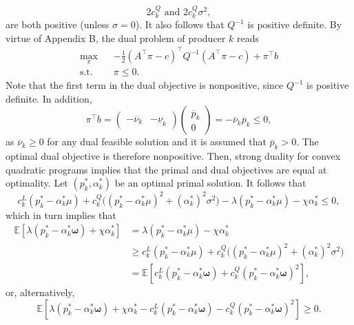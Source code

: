 \documentclass{article}
\begin{document}
\begin{equation*}
2c_k^Q \mbox{ and } 2c_k^Q\sigma^2,
\end{equation*}
are both positive (unless $\sigma = 0$). It also follows that $Q^{-1}$ is positive definite. By virtue of Appendix B, the dual problem of producer $k$ reads 
\begin{align*}
\underset{\pi}{\max} \hspace{10pt} & -\frac{1}{2}(A^\top \pi -c)^\top Q^{-1} (A^\top \pi -c) + \pi^\top b\\
\mbox{s.t. } & \pi \le 0.
\end{align*}
Note that the first term in the dual objective is nonpositive, since $Q^{-1}$ is positive definite. In addition,
\begin{equation*}
\pi^\top b = \begin{pmatrix}-\overline{\nu}_k & -\underline{\nu}_k \end{pmatrix}\begin{pmatrix} \overline{p}_k\\0\end{pmatrix} = -\overline{\nu}_k \overline{p}_k \le 0,
\end{equation*}
as $\overline{\nu}_k \ge 0$ for any dual feasible solution and it is assumed that $\overline{p}_k > 0$. The optimal dual objective is therefore nonpositive. Then, strong duality for convex quadratic programs \cite{Dorn1960} implies that the primal and dual objectives are equal at optimality. Let $(p_k^*, \alpha_k^*)$ be an optimal primal solution. It follows that
\begin{equation*}
c_k^L(p_k^* - \alpha_k^* \mu) + c_k^Q \big((p_k^* - \alpha_k^* \mu)^2 + (\alpha_k^*)^2 \sigma^2\big) - \lambda (p_k^* - \alpha_k^* \mu) - \chi \alpha_k^* \le 0,
\end{equation*}
which in turn implies that
\begin{align*}
\mathbb{E}[\lambda (p_k^* - \alpha_k^* \boldsymbol{\omega}) + \chi \alpha_k^*] &= \lambda (p_k^* - \alpha_k^* \mu) - \chi \alpha_k^*\\
&\ge c_k^L(p_k^* - \alpha_k^* \mu) + c_k^Q \big((p_k^* - \alpha_k^* \mu)^2 + (\alpha_k^*)^2 \sigma^2\big)\\ 
&= \mathbb{E}[c_k^L(p_k^* - \alpha_k^* \boldsymbol{\omega}) + c_k^Q (p_k^* - \alpha_k^* \boldsymbol{\omega})^2],
\end{align*}
or, alternatively,
\begin{equation*}
\mathbb{E}[\lambda (p_k^* - \alpha_k^* \boldsymbol{\omega}) + \chi \alpha_k^* - c_k^L(p_k^* - \alpha_k^* \boldsymbol{\omega}) - c_k^Q (p_k^* - \alpha_k^* \boldsymbol{\omega})^2] \ge 0.
\end{equation*}
\end{document}
